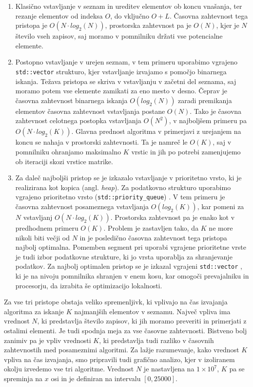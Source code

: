 \documentclass[a4paper,12pt,openright]{book}
\begin{document}
        \begin{enumerate}
            \item Klasično vstavljanje v seznam in ureditev elementov ob koncu vnašanja, ter rezanje elementov od indeksa $O$, do vključno $O+L$. Časovna zahtevnost tega pristopa je $O(N \cdot log_2(N))$, prostorska zahtevnost pa je $O(N)$, kjer je $N$ število vseh zapisov, saj moramo v pomnilniku držati vse potencialne elemente.
            \item Postopno vstavljanje v urejen seznam, v tem primeru uporabimo vgrajeno {\tt std::vector} \cite{CPP_VECTOR} strukturo, kjer vstavljanje izvajamo s pomočjo binarnega iskanja. Težava pristopa se skriva v vstavljanju v začetni del seznama, saj moramo potem vse elemente zamikati za eno mesto v desno. Čeprav je časovna zahtevnost binarnega iskanja $O(log_2(N))$ zaradi premikanja elementov časovna zahtevnost vstavljanja postane $O(N)$. Tako je časovna zahtevnost celotnega postopka vstavljanja $O(N^2)$, v najboljšem primeru pa $O(N \cdot log_2(K))$. Glavna prednost algoritma v primerjavi z urejanjem na koncu se nahaja v prostorski zahtevnosti. Ta je namreč le $O(K)$, saj v pomnilniku ohranjamo maksimalno $K$ vrstic in jih po potrebi zamenjujemo ob iteraciji skozi vrstice matrike.
            \item Za daleč najboljši pristop se je izkazalo vstavljanje v prioritetno vrsto, ki je realizirana kot kopica (angl. \textit{heap}). Za podatkovno strukturo uporabimo vgrajeno prioritetno vrsto ({\tt std::priority\_queue}) \cite{CPP_PQUEUE}. V tem primeru je časovna zahtevnost posameznega vstavljanja $O(log_2(K))$, kar pomeni za $N$ vstavljanj $O(N \cdot log_2(K))$. Prostorska zahtevnost pa je enako kot v predhodnem primeru $O(K)$. Problem je zastavljen tako, da $K$ ne more nikoli biti večji od $N$ in je posledično časovna zahtevnost tega pristopa najbolj optimalna. Pomemben segment pri uporabi vgrajene prioritetne vrste je tudi izbor podatkovne strukture, ki jo vrsta uporablja za shranjevanje podatkov. Za najbolj optimalen pristop se je izkazal vgrajeni {\tt std::vector} \cite{CPP_VECTOR}, ki je na nivoju pomnilnika shranjen v enem kosu, kar omogoči prevajalniku in procesorju, da izrabita še optimizacijo lokalnosti.
        \end{enumerate}

        \noindent
        Za vse tri pristope obstaja veliko spremenljivk, ki vplivajo na čas izvajanja algoritma za iskanje $K$ najmanjših elementov v seznamu. Največ vpliva ima vrednost $N$, ki predstavlja število zapisov, ki jih moramo preveriti in primerjati z ostalimi elementi. Je tudi spodnja meja za vse časovne zahtevnosti. Bistveno bolj zanimiv pa je vpliv vrednosti $K$, ki predstavlja tudi razliko v časovnih zahtevnostih med posameznimi algoritmi. Za lažje razumevanje, kako vrednost $K$ vpliva na čas izvajanja, smo pripravili tudi grafično analizo, kjer v izoliranem okolju izvedemo vse tri algoritme. Vrednost $N$ je nastavljena na $1 \times 10^7$, $K$ pa se spreminja na $x$ osi in je definiran na intervalu $[0, 25000]$.
\end{document}
